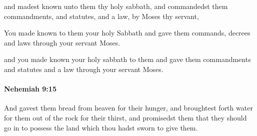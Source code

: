 			\begin{versebox}
					\item[BHS] 
					\item[LXX] 
					\item[ASV] and madest known unto them thy holy sabbath, and commandedst them commandments, and statutes, and a law, by Moses thy servant,
					\item[NIV] You made known to them your holy Sabbath and gave them commands, decrees and laws through your servant Moses.
					\item[NRSV] and you made known your holy sabbath to them and gave them commandments and statutes and a law through your servant Moses.
			\end{versebox}

		\paragraph{Nehemiah 9:15} %
			\label{NEHEMIAH-9-15}

			And gavest them bread from heaven for their hunger, and broughtest forth water for them out of the rock for their thirst, and promisedst them that they should go in to possess the land which thou hadst sworn to give them.

